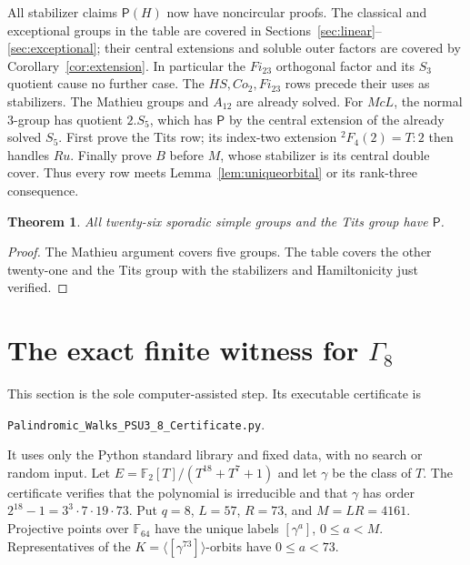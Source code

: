 \documentclass[11pt]{article}
\newtheorem{theorem}{Theorem}[section]
\theoremstyle{definition}
\newcommand{\F}{\mathbb F}
\newcommand{\Pp}{\mathsf P}
\begin{document}
All stabilizer claims $\Pp(H)$ now have noncircular proofs. The classical and exceptional groups in the table are covered in Sections~\ref{sec:linear}--\ref{sec:exceptional}; their central extensions and soluble outer factors are covered by Corollary~\ref{cor:extension}. In particular the $Fi_{23}$ orthogonal factor and its $S_3$ quotient cause no further case. The $HS,Co_2,Fi_{23}$ rows precede their uses as stabilizers. The Mathieu groups and $A_{12}$ are already solved. For $McL$, the normal $3$-group has quotient $2.S_5$, which has $\Pp$ by the central extension of the already solved $S_5$. First prove the Tits row; its index-two extension $^2F_4(2)=T:2$ then handles $Ru$. Finally prove $B$ before $M$, whose stabilizer is its central double cover. Thus every row meets Lemma~\ref{lem:uniqueorbital} or its rank-three consequence.
\begin{theorem}\label{thm:sporadic}
All twenty-six sporadic simple groups and the Tits group have $\Pp$.
\end{theorem}
\begin{proof}
The Mathieu argument covers five groups. The table covers the other twenty-one and the Tits group with the stabilizers and Hamiltonicity just verified.
\end{proof}

\section{The exact finite witness for \texorpdfstring{$\Gamma_8$}{Gamma(8)}}\label{sec:certificate}
This section is the sole computer-assisted step. Its executable certificate is
\begin{center}\texttt{Palindromic\_Walks\_PSU3\_8\_Certificate.py}.\end{center}
It uses only the Python standard library and fixed data, with no search or random input.
Let $E=\F_2[T]/(T^{18}+T^7+1)$ and let $\gamma$ be the class of $T$. The certificate verifies that the polynomial is irreducible and that $\gamma$ has order $2^{18}-1=3^3\cdot7\cdot19\cdot73$. Put $q=8$, $L=57$, $R=73$, and $M=LR=4161$. Projective points over $\F_{64}$ have the unique labels $[\gamma^a]$, $0\le a<M$. Representatives of the $K=\langle[\gamma^{73}]\rangle$-orbits have $0\le a<73$.
\end{document}

